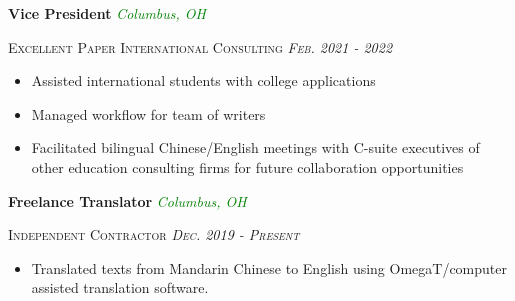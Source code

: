 \documentclass[11pt]{article}
\begin{document}
\noindent \textbf{Vice President} \hfill \textcolor{green}{\textit{Columbus, OH}}

\noindent \textsc{Excellent Paper International Consulting \hfill {\textit{Feb. 2021 - 2022}}}
\vspace{-2mm}
\begin{itemize}
    \setlength{\itemsep}{0cm}
    \setlength{\parskip}{0cm}
    \addtolength{\leftskip}{-5mm}
    \item Assisted international students with college applications
    \item Managed workflow for team of writers
    \item Facilitated bilingual Chinese/English meetings with C-suite executives of other education consulting firms for future collaboration opportunities
\end{itemize}

\noindent \textbf{Freelance Translator} \hfill \textcolor{green}{\textit{Columbus, OH}}

\noindent \textsc{Independent Contractor \hfill {\textit{Dec. 2019 - Present}}}
\vspace{-2mm}
\begin{itemize}
    \setlength{\itemsep}{0cm}
    \setlength{\parskip}{0cm}
    \addtolength{\leftskip}{-5mm}
    \item Translated texts from Mandarin Chinese to English using OmegaT/computer assisted translation software.
\end{itemize}
\end{document}
